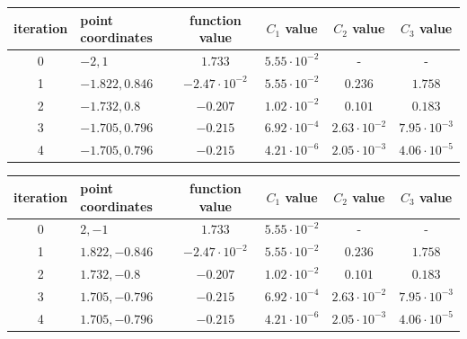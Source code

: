 \documentclass[12pt]{article}
\begin{document}
	\begin{table}[H]
		\begin{tabularx}{\textwidth}{c|X|c|c|c|c|}
			iteration & point coordinates & function value & $C_1$ value & $C_2$ value & $C_3$ value\\
			\hline
			0 & $-2, 1$ & $1.733$ & $5.55\cdot10^{-2}$ & - & - \\
			\hline
			1 & $-1.822, 0.846$ & $-2.47\cdot10^{-2}$ & $5.55\cdot10^{-2}$ & $0.236$ & $1.758$ \\
			\hline
			2 & $-1.732, 0.8$ & $-0.207$ & $1.02\cdot10^{-2}$ & $0.101$ & $0.183$ \\ 
			\hline
			3 & $-1.705, 0.796$ & $-0.215$ & $6.92\cdot10^{-4}$ & $2.63\cdot10^{-2}$ & $7.95\cdot10^{-3}$ \\
			\hline
			4 & $-1.705, 0.796$ & $-0.215$ & $4.21\cdot10^{-6}$ & $2.05\cdot10^{-3}$ & $4.06\cdot10^{-5}$ \\
			\hline
		\end{tabularx}	
	\end{table}	

	\begin{table}[H]
		\begin{tabularx}{\textwidth}{c|X|c|c|c|c|}
			iteration & point coordinates & function value & $C_1$ value & $C_2$ value & $C_3$ value\\
			\hline
			0 & $2, -1$ & $1.733$ & $5.55\cdot10^{-2}$ & - & - \\
			\hline
			1 & $1.822, -0.846$ & $-2.47\cdot10^{-2}$ & $5.55\cdot10^{-2}$ & $0.236$ & $1.758$ \\
			\hline
			2 & $1.732, -0.8$ & $-0.207$ & $1.02\cdot10^{-2}$ & $0.101$ & $0.183$ \\ 
			\hline
			3 & $1.705, -0.796$ & $-0.215$ & $6.92\cdot10^{-4}$ & $2.63\cdot10^{-2}$ & $7.95\cdot10^{-3}$ \\
			\hline
			4 & $1.705, -0.796$ & $-0.215$ & $4.21\cdot10^{-6}$ & $2.05\cdot10^{-3}$ & $4.06\cdot10^{-5}$ \\
			\hline
		\end{tabularx}	
	\end{table}	
\end{document}
